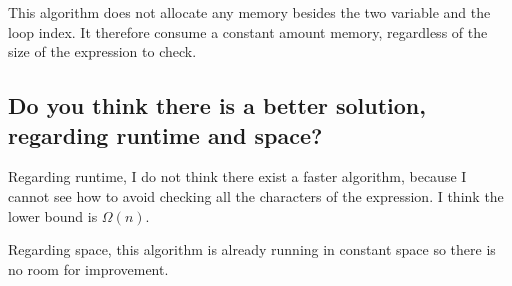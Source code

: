 \documentclass[11pt]{article}
\begin{document}
This algorithm does not allocate any memory besides the two
variable and the loop index. It therefore consume a constant amount
memory, regardless of the size of the expression to check.

\subsection{Do you think there is a better solution, regarding runtime and space?}
\label{sec:org7e993d0}

Regarding runtime, I do not think there exist a faster algorithm,
because I cannot see how to avoid checking all the characters of the
expression. I think the lower bound is \(\Omega(n)\).

Regarding space, this algorithm is already running in constant space
so there is no room for improvement.
\end{document}
